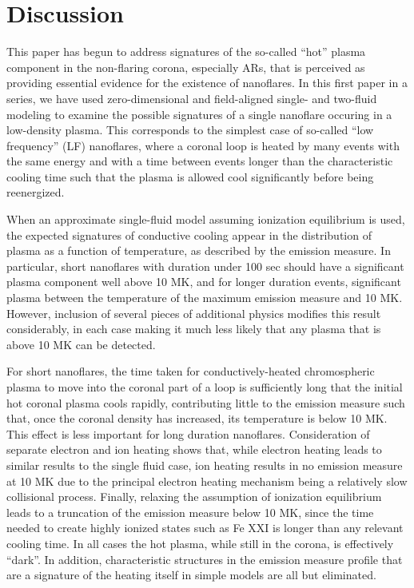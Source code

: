 \documentclass[iop]{emulateapj}
\begin{document}
	\section{Discussion}
	\label{sec:discussion}
	\par This paper has begun to address signatures of the so-called ``hot'' plasma component in the non-flaring corona, especially ARs, that is perceived as providing essential evidence for the existence of nanoflares. In this first paper in a series, we have used zero-dimensional and field-aligned single- and two-fluid modeling to examine the possible signatures of a single nanoflare occuring in a low-density plasma. This corresponds to the simplest case of so-called ``low frequency'' (LF) nanoflares, where a coronal loop is heated by many events with the same energy and with a time between events longer than the characteristic cooling time such that the plasma is allowed cool significantly before being reenergized.
	\par When an approximate single-fluid model assuming ionization equilibrium is used, the expected signatures of conductive cooling appear in the distribution of plasma as a function of temperature, as described by the emission measure. In particular, short nanoflares with duration under 100 sec should have a significant plasma component well above 10 MK, and for longer duration events, significant plasma between the temperature of the maximum emission measure and 10 MK. However, inclusion of several pieces of additional physics modifies this result considerably, in each case making it much less likely that any plasma that is above 10 MK can be detected.
	\par For short nanoflares, the time taken for conductively-heated chromospheric plasma to move into the coronal part of a loop is sufficiently long that the initial hot coronal plasma cools rapidly, contributing little to the emission measure such that, once the coronal density has increased, its temperature is below 10 MK. This effect is less important for long duration nanoflares. Consideration of separate electron and ion heating shows that, while electron heating leads to similar results to the single fluid case, ion heating results in no emission measure at 10 MK due to the principal electron heating mechanism being a relatively slow collisional process. Finally, relaxing the assumption of ionization equilibrium leads to a truncation of the emission measure below 10 MK, since the time needed to create highly ionized states such as Fe XXI is longer than any relevant cooling time. In all cases the hot plasma, while still in the corona, is effectively ``dark''. In addition, characteristic structures in the emission measure profile that are a signature of the heating itself in simple models are all but eliminated.
\end{document}
